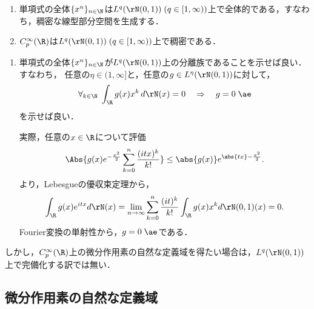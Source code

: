 \documentclass[uplatex,dvipdfmx]{jsreport}
\begin{document}
\begin{proposition}\mbox{}\label{prop-denseness-of-monomial-in-Gaussian-space}
    \begin{enumerate}
        \item 単項式の全体$\{x^n\}_{n\in\N}$は$L^q(\rN(0,1))\;(q\in[1,\infty))$上で全体的である，すなわち，稠密な線型部分空間を生成する．
        \item $C_p^\infty(\R)$は$L^q(\rN(0,1))\;(q\in[1,\infty))$上で稠密である．
    \end{enumerate}
\end{proposition}
\begin{Proof}\mbox{}
    \begin{enumerate}
        \item 単項式の全体$\{x^n\}_{n\in\N}$が$L^q(\rN(0,1))$上の分離族であることを示せば良い．すなわち，
        任意の$\eta\in{(1,\infty]}$と，任意の$g\in L^\eta(\rN(0,1))$に対して，
        \[\forall_{k\in\N}\;\int_\R g(x)x^k\,d\rN(x)=0\quad\Rightarrow\quad g=0\;\ae\]
        を示せば良い．

        実際，任意の$x\in\R$について評価
        \[\Abs{g(x)e^{-\frac{x^2}{2}}\sum_{k=0}^n\frac{(itx)^k}{k!}}\le\abs{g(x)}e^{\abs{tx}-\frac{x^2}{2}}.\]
        より，Lebesgueの優収束定理から，
        \[\int_\R g(x)e^{itx}d\rN(x)=\lim_{n\to\infty}\sum_{k=0}^n\frac{(it)^k}{k!}\int_\R g(x)x^kd\rN(0,1)(x)=0.\]
        Fourier変換の単射性から，$g=0\;\ae$である．
    \end{enumerate}
\end{Proof}
\begin{remarks}
    しかし，$C_p^\infty(\R)$上の微分作用素の自然な定義域を得たい場合は，$L^q(\rN(0,1))$上で完備化する訳では無い．
\end{remarks}

\subsection{微分作用素の自然な定義域}
\end{document}
